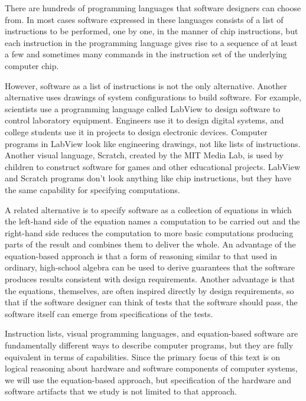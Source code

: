 There are hundreds of programming languages
that software designers can choose from.
In most cases software expressed in these languages consists
of a list of instructions to be performed, one by one,
in the manner of chip instructions,
but each instruction in the programming language gives
rise to a sequence of at least a few and sometimes many
commands in the instruction set of the underlying computer chip.

However, software as a list of instructions is
not the only alternative.
Another alternative uses drawings of
system configurations to build software.
For example, scientists use a programming language called
LabView
to design software to control laboratory equipment.
Engineers use it to design digital systems,
and college students use it in projects to
design electronic devices.
Computer programs in LabView look like engineering drawings,
not like lists of instructions.
Another visual language,
Scratch, created by the MIT Media Lab,
is used by children to construct software for games
and other educational projects.
LabView and Scratch programs don't
look anything like chip instructions,
but they have the same capability for specifying computations.

A related alternative is to specify software as
a collection of equations in which
the left-hand side of the equation names a computation to be carried out
and the right-hand side reduces the computation to
more basic computations producing parts of the result
and combines them to deliver the whole.
An advantage of the equation-based approach
is that a form of reasoning similar to that used
in ordinary, high-school algebra can be used to derive
guarantees that the software produces results consistent
with design requirements.
Another advantage is that the equations, themselves,
are often inspired directly by design requirements,
so that if the software designer can think of tests
that the software should pass, the software itself
can emerge from specifications of the tests.

Instruction lists, visual programming languages, and equation-based
software are fundamentally different ways to describe computer programs,
but they are fully equivalent in terms of capabilities.
Since the primary focus of this text is on logical reasoning
about hardware and software components of computer systems,
we will use the equation-based approach,
but specification of the hardware and software artifacts that we study
is not limited to that approach.

